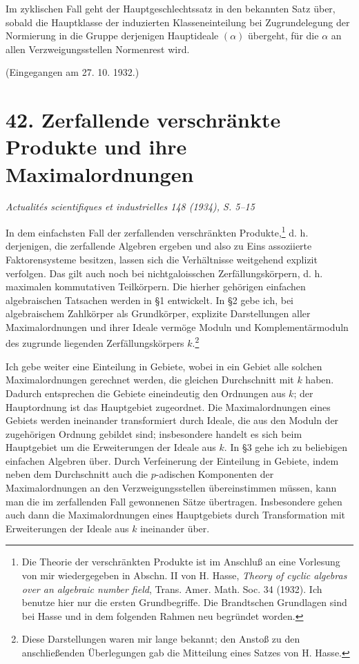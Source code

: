 \documentclass[11pt]{article}
\begin{document}
Im zyklischen Fall geht der Hauptgeschlechtssatz in den bekannten Satz über, sobald die Hauptklasse der induzierten Klasseneinteilung bei Zugrundelegung der Normierung in die Gruppe derjenigen Hauptideale \((\alpha)\) übergeht, für die \(\alpha\) an allen Verzweigungsstellen Normenrest wird.

\begin{center}
(Eingegangen am 27. 10. 1932.)
\end{center}

\section*{42. Zerfallende verschränkte Produkte und ihre Maximalordnungen}

\begin{center}
\emph{Actualités scientifiques et industrielles 148 (1934), S. 5--15}
\end{center}

In dem einfachsten Fall der zerfallenden verschränkten Produkte,\footnote{Die Theorie der verschränkten Produkte ist im Anschluß an eine Vorlesung von mir wiedergegeben in Abschn. II von H. Hasse, \emph{Theory of cyclic algebras over an algebraic number field}, Trans. Amer. Math. Soc. 34 (1932). Ich benutze hier nur die ersten Grundbegriffe. Die Brandtschen Grundlagen sind bei Hasse und in dem folgenden Rahmen neu begründet worden.} d. h. derjenigen, die zerfallende Algebren ergeben und also zu Eins assoziierte Faktorensysteme besitzen, lassen sich die Verhältnisse weitgehend explizit verfolgen. Das gilt auch noch bei nichtgaloisschen Zerfällungskörpern, d. h. maximalen kommutativen Teilkörpern. Die hierher gehörigen einfachen algebraischen Tatsachen werden in §1 entwickelt. In §2 gebe ich, bei algebraischem Zahlkörper als Grundkörper, explizite Darstellungen aller Maximalordnungen und ihrer Ideale vermöge Moduln und Komplementärmoduln des zugrunde liegenden Zerfällungskörpers \(k\).\footnote{Diese Darstellungen waren mir lange bekannt; den Anstoß zu den anschließenden Überlegungen gab die Mitteilung eines Satzes von H. Hasse.}

Ich gebe weiter eine Einteilung in Gebiete, wobei in ein Gebiet alle solchen Maximalordnungen gerechnet werden, die gleichen Durchschnitt mit \(k\) haben. Dadurch entsprechen die Gebiete eineindeutig den Ordnungen aus \(k\); der Hauptordnung ist das Hauptgebiet zugeordnet. Die Maximalordnungen eines Gebiets werden ineinander transformiert durch Ideale, die aus den Moduln der zugehörigen Ordnung gebildet sind; insbesondere handelt es sich beim Hauptgebiet um die Erweiterungen der Ideale aus \(k\). In §3 gehe ich zu beliebigen einfachen Algebren über. Durch Verfeinerung der Einteilung in Gebiete, indem neben dem Durchschnitt auch die \(p\)-adischen Komponenten der Maximalordnungen an den Verzweigungsstellen übereinstimmen müssen, kann man die im zerfallenden Fall gewonnenen Sätze übertragen. Insbesondere gehen auch dann die Maximalordnungen eines Hauptgebiets durch Transformation mit Erweiterungen der Ideale aus \(k\) ineinander über.
\end{document}
